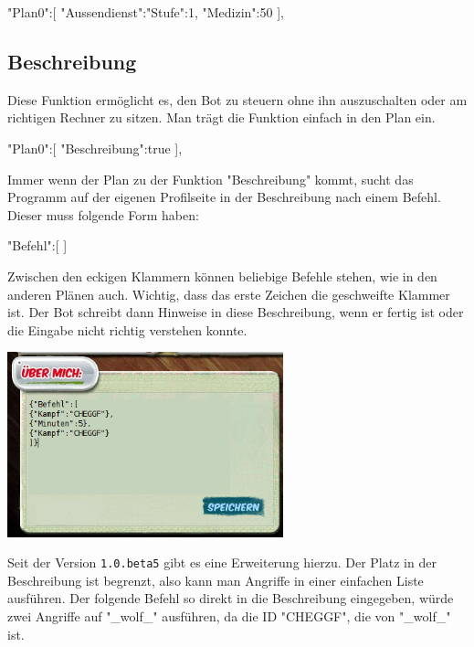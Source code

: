 \documentclass{scrartcl}
\begin{document}
\begin{code}[language=bash]
"Plan0":[
	{"Aussendienst":{"Stufe":1, "Medizin":50}}
],
\end{code}


\subsection{Beschreibung}
Diese Funktion ermöglicht es, den Bot zu steuern ohne ihn auszuschalten oder am richtigen Rechner zu sitzen. Man trägt die Funktion einfach in den Plan ein.

\begin{code}[language=bash]
"Plan0":[
	{"Beschreibung":true}
],
\end{code}

Immer wenn der Plan zu der Funktion "Beschreibung" kommt, sucht das Programm auf der eigenen Profilseite in der Beschreibung nach einem Befehl. Dieser muss folgende Form haben: 

\begin{code}[language=bash]
{"Befehl":[
]}
\end{code}

Zwischen den eckigen Klammern können beliebige Befehle stehen, wie in den anderen Plänen auch. Wichtig, dass das erste Zeichen die geschweifte Klammer ist. Der Bot schreibt dann Hinweise in diese Beschreibung, wenn er fertig ist oder die Eingabe nicht richtig verstehen konnte.

\begin{center}
\includegraphics[width=8cm]{Beschreibung.png}
\end{center}

Seit der Version \texttt{1.0.beta5} gibt es eine Erweiterung hierzu. Der Platz in der Beschreibung ist begrenzt, also kann man Angriffe in einer einfachen Liste ausführen. Der folgende Befehl so direkt in die Beschreibung eingegeben, würde zwei Angriffe auf "\_wolf\_" ausführen, da die ID "CHEGGF", die von "\_wolf\_" ist.
\end{document}
